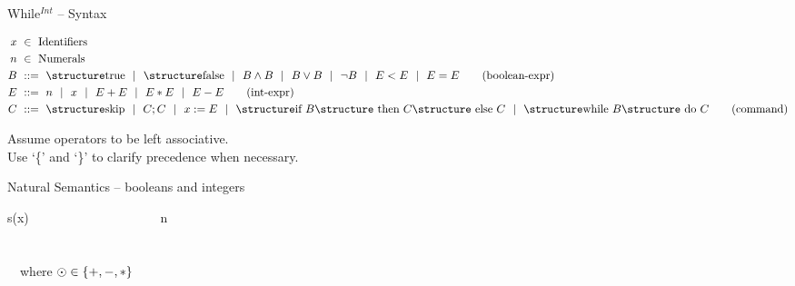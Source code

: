 \documentclass[aspectratio=169]{beamer}
\begin{document}
\begin{slide}{While$^{Int}$ -- Syntax}
\small

\begin{align*}
  x &~\in~ \text{Identifiers}
  \\
  n &~\in~ \text{Numerals}
  \\
  B &~::=~ \kw{true} ~~|~~ \kw{false}  ~~|~~ B \land B ~~|~~ B \lor B ~~|~~ \lnot B ~~|~~ E<E ~~|~~ E=E
  \tag{boolean-expr}\\
  E &~::=~ n ~~|~~ x ~~|~~ E+E ~~|~~ E*E ~~|~~ E-E
  \tag{int-expr}\\
  C &~::=~ \kw {skip} ~~|~~ C;C ~~|~~ x:=E
 ~~|~~  \kw{if } B \kw{ then } C\kw{ else }C ~~|~~  \kw{while }B\kw{ do }C
  \tag{command}
\end{align*}

Assume operators to be left associative.
\\Use `\{' and `\}' to clarify precedence when necessary.

\end{slide}


\begin{slide}{Natural Semantics -- booleans and integers}
\small 
\centering
\newcommand{\msep}{~~~~~~}


%
  {\shrk}{\alert{\leadsto s(x)}}
\msep
{}%
  {\shrk}{\alert{\leadsto {}}}
\msep
{}%
  {\shrk}{\alert{\leadsto {}}}
\msep
{}%
  {\shrk}{\alert{\leadsto n}}
\\[5mm]
\msep
{}
\\[5mm]
\msep
{}
\\[5mm]
%
  ~~where $\odot \in \left\{ +,-,* \right\}$
\end{slide}
\end{document}
